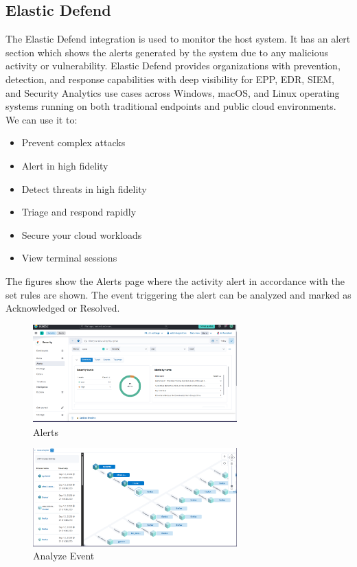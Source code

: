 \documentclass{report}
\begin{document}
\subsection{Elastic Defend}
The Elastic Defend integration is used to monitor the host system.
It has an alert section which shows the alerts generated by the system due to any malicious activity or vulnerability.
Elastic Defend provides organizations with prevention, detection, and response capabilities with deep visibility 
for EPP, EDR, SIEM, and Security Analytics use cases 
across Windows, macOS, and Linux operating systems running on both traditional endpoints and public cloud environments.
We can use it to:
\begin{itemize}
	\item Prevent complex attacks 
	\item Alert in high fidelity
	\item Detect threats in high fidelity
	\item Triage and respond rapidly
	\item Secure your cloud workloads
	\item View terminal sessions
\end{itemize}
The figures show the Alerts page where the activity alert in accordance with the set rules are shown.
The event triggering the alert can be analyzed and marked as Acknowledged or Resolved.

\begin{figure}[!h]
	\centering
	\includegraphics[width=0.7\textwidth]{Images/alerts.png}
	\caption{Alerts}
	\label{fig:Alerts}
\end{figure}
\begin{figure}[!h]
	\centering
	\includegraphics[width=0.7\textwidth]{Images/analyze event.png}
	\caption{Analyze Event}
	\label{fig:Analyze Event}
\end{figure}
\end{document}
